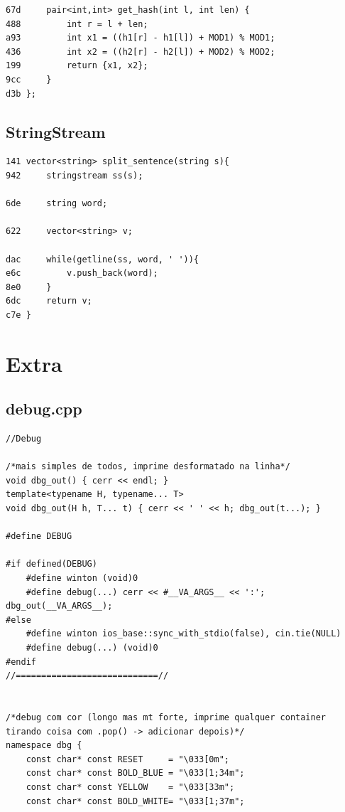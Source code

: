 \documentclass[11pt, a4paper, twoside]{article}
\begin{document}
{\begin{lstlisting}
67d     pair<int,int> get_hash(int l, int len) {
488         int r = l + len;
a93         int x1 = ((h1[r] - h1[l]) + MOD1) % MOD1;
436         int x2 = ((h2[r] - h2[l]) + MOD2) % MOD2;
199         return {x1, x2};
9cc     }
d3b };
\end{lstlisting}

\subsection{StringStream}
\begin{lstlisting}
141 vector<string> split_sentence(string s){
942     stringstream ss(s);
    
6de     string word;
    
622     vector<string> v;
    
dac     while(getline(ss, word, ' ')){
e6c         v.push_back(word);
8e0     }
6dc     return v;
c7e }
\end{lstlisting}

\pagebreak


%
%

\section{Extra}

\subsection{debug.cpp}
\begin{lstlisting}
//Debug

/*mais simples de todos, imprime desformatado na linha*/
void dbg_out() { cerr << endl; }
template<typename H, typename... T> 
void dbg_out(H h, T... t) { cerr << ' ' << h; dbg_out(t...); }

#define DEBUG

#if defined(DEBUG)
    #define winton (void)0
    #define debug(...) cerr << #__VA_ARGS__ << ':'; dbg_out(__VA_ARGS__);
#else
    #define winton ios_base::sync_with_stdio(false), cin.tie(NULL)
    #define debug(...) (void)0
#endif
//============================//


/*debug com cor (longo mas mt forte, imprime qualquer container tirando coisa com .pop() -> adicionar depois)*/
namespace dbg {
    const char* const RESET     = "\033[0m";
    const char* const BOLD_BLUE = "\033[1;34m";
    const char* const YELLOW    = "\033[33m";
    const char* const BOLD_WHITE= "\033[1;37m";


\end{lstlisting}}
\end{document}
